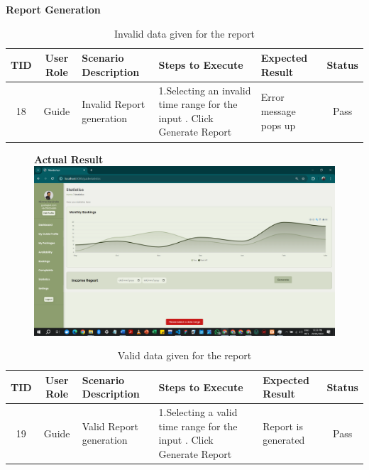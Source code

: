 \textbf{Report Generation}\\
\begin{table}[ht]
\centering
\begin{tabularx}{\textwidth}{|c|c|X|X|X|c|}
\hline
\textbf{TID} & \textbf{User Role} & \textbf{Scenario Description} & \textbf{Steps to Execute} & \textbf{Expected Result} & \textbf{Status} \\ \hline
18 & Guide & Invalid Report generation & 1.Selecting an invalid time range for the input \newline2. Click Generate Report & Error message pops up & Pass \\ \hline
\end{tabularx}
\caption{Invalid data given for the report}
\end{table}

\begin{figure}[h!]
    \centering
    \textbf{Actual Result}
    \includegraphics[width=1\textwidth]{Images/Test Cases/18. invalid report.png}
\end{figure}
\clearpage


\begin{table}[ht]
\centering
\begin{tabularx}{\textwidth}{|c|c|X|X|X|c|}
\hline
\textbf{TID} & \textbf{User Role} & \textbf{Scenario Description} & \textbf{Steps to Execute} & \textbf{Expected Result} & \textbf{Status} \\ \hline
19 & Guide & Valid Report generation & 1.Selecting a valid time range for the input \newline2. Click Generate Report & Report is generated & Pass \\ \hline
\end{tabularx}
\caption{Valid data given for the report}
\end{table}

